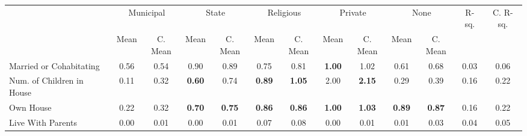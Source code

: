 \begin{tabular}{l c c c c c c c c c c c c}
\toprule
& \multicolumn{2}{c}{Municipal} & \multicolumn{2}{c}{State} & \multicolumn{2}{c}{Religious} & \multicolumn{2}{c}{Private} & \multicolumn{2}{c}{None} & R-sq. & C. R-sq. \\
& \scriptsize Mean & \scriptsize C. Mean & \scriptsize Mean & \scriptsize C. Mean & \scriptsize Mean & \scriptsize C. Mean & \scriptsize Mean & \scriptsize C. Mean & \scriptsize Mean & \scriptsize C. Mean & & \\
\midrule
Married or Cohabitating &      0.56 & 0.54 &      0.90 & 0.89 &      0.75 & 0.81 & \textbf{     1.00} & 1.02 &      0.61 & 0.68 &      0.03 &      0.06 \\
Num. of Children in House &      0.11 & 0.32 & \textbf{     0.60} & 0.74 & \textbf{     0.89} & \textbf{     1.05} &      2.00 & \textbf{     2.15} &      0.29 & 0.39 &      0.16 &      0.22 \\
Own House &      0.22 & 0.32 & \textbf{     0.70} & \textbf{     0.75} & \textbf{     0.86} & \textbf{     0.86} & \textbf{     1.00} & \textbf{     1.03} & \textbf{     0.89} & \textbf{     0.87} &      0.16 &      0.22 \\
Live With Parents &      0.00 & 0.01 &      0.00 & 0.01 &      0.07 & 0.08 &      0.00 & 0.01 &      0.01 & 0.03 &      0.04 &      0.05 \\
\bottomrule
\end{tabular}
